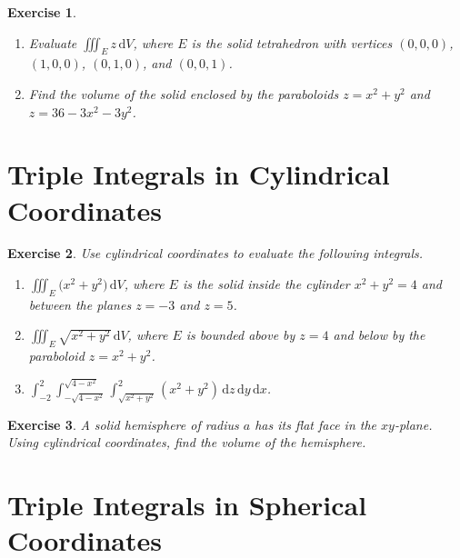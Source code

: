 \documentclass[12pt,a4paper]{article}
\theoremstyle{exercise}
\newtheorem{exercise}{Exercise}[section]
\theoremstyle{hint}
\newcommand{\dd}{\,\mathrm{d}}
\begin{document}
\begin{exercise}
\begin{enumerate}[label=(\alph*)]
  \item Evaluate $\displaystyle\iiint_{E}z\dd V$, where $E$ is the solid
        tetrahedron with vertices $(0,0,0)$, $(1,0,0)$, $(0,1,0)$, and
        $(0,0,1)$.
  \item Find the volume of the solid enclosed by the paraboloids
        $z=x^{2}+y^{2}$ and $z=36-3x^{2}-3y^{2}$.
\end{enumerate}
\end{exercise}

\section{Triple Integrals in Cylindrical Coordinates}

\begin{exercise}
Use cylindrical coordinates to evaluate the following integrals.
\begin{enumerate}[label=(\alph*)]
  \item $\displaystyle\iiint_{E}\bigl(x^{2}+y^{2}\bigr)\dd V$, where $E$
        is the solid inside the cylinder $x^{2}+y^{2}=4$ and between the
        planes $z=-3$ and $z=5$.
  \item $\displaystyle\iiint_{E}\sqrt{x^{2}+y^{2}}\dd V$, where $E$ is
        bounded above by $z=4$ and below by the paraboloid
        $z=x^{2}+y^{2}$.
  \item $\displaystyle\int_{-2}^{2}\int_{-\sqrt{4-x^{2}}}^{\sqrt{4-x^{2}}}
          \int_{\sqrt{x^{2}+y^{2}}}^{2}(x^{2}+y^{2})\dd z\dd y\dd x$.
\end{enumerate}
\end{exercise}

\begin{exercise}
A solid hemisphere of radius $a$ has its flat face in the $xy$-plane.
Using cylindrical coordinates, find the volume of the hemisphere.
\end{exercise}

\section{Triple Integrals in Spherical Coordinates}
\end{document}
